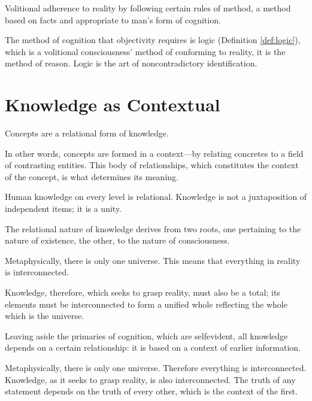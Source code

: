             \begin{definition}[Obectivity]
            \label{def:objectivity}
                Volitional adherence to reality by following certain rules of method, a method based on facts and appropriate to man's form of cognition.
            \end{definition}

        The method of cognition that objectivity requires is logic (Definition \ref{def:logic}), which is a volitional consciousness' method of conforming to reality, it is the method of reason. Logic is the art of noncontradictory identification.

    \section{Knowledge as Contextual}

        Concepts are a relational form of knowledge.

        In other words, concepts are formed in a context—by relating concretes to a field of contrasting entities. This body of relationships, which constitutes the context of the concept, is what determines its meaning.

        Human knowledge on every level is relational. Knowledge
        is not a juxtaposition of independent items; it is a unity.

        The relational nature of knowledge derives from two roots, one pertaining to the nature of existence, the other, to the nature of consciousness.

        Metaphysically, there is only one universe. This means that everything in reality is interconnected.

        Knowledge, therefore, which seeks to grasp reality, must also be a total; its elements must be interconnected to form a unified whole reflecting the whole which is the universe.

        Leaving aside the primaries of cognition, which are selfevident, all knowledge depends on a certain relationship: it is based on a context of earlier information.

        \begin{theorem}
            \label{the:context}
                Metaphysically, there is only one universe. Therefore everything is interconnected. Knowledge, as it seeks to grasp reality, is also interconnected. The truth of any statement depends on the truth of every other, which is the context of the first.
        \end{theorem}

